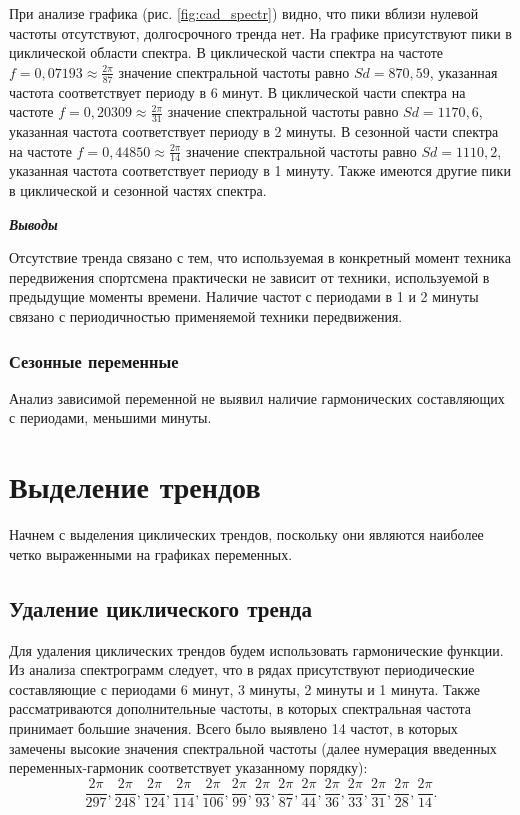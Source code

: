 \documentclass[a4paper,12pt]{article}
\begin{document}
При анализе графика (рис. \ref{fig:cad_spectr}) видно, что пики вблизи нулевой частоты отсутствуют, долгосрочного тренда нет. На графике присутствуют пики в циклической области спектра. 
В циклической части спектра на частоте $f = 0,07193 \approx \frac{2 \pi}{87}$ значение спектральной частоты равно $Sd = 870,59$, указанная частота соответствует периоду в 6 минут.
В циклической части спектра на частоте $f = 0,20309 \approx \frac{2 \pi}{31}$ значение спектральной частоты равно $Sd = 1170,6$, указанная частота соответствует периоду в 2 минуты.
В сезонной части спектра на частоте $f = 0,44850 \approx \frac{2 \pi}{14}$ значение спектральной частоты равно $Sd = 1110,2$, указанная частота соответствует периоду в 1 минуту.
Также имеются другие пики в циклической и сезонной частях спектра.


\textbf{\textit{Выводы}}

Отсутствие тренда связано с тем, что используемая в конкретный момент техника передвижения спортсмена практически не зависит от техники, используемой в предыдущие моменты времени.
Наличие частот с периодами в 1 и 2 минуты связано с периодичностью применяемой техники передвижения. %

\subsubsection{Сезонные переменные}
Анализ зависимой переменной не выявил наличие гармонических составляющих с периодами, меньшими минуты.

\section{Выделение трендов}
Начнем с выделения циклических трендов, поскольку они являются наиболее четко выраженными на графиках переменных.

\subsection{Удаление циклического тренда}
Для удаления циклических трендов будем использовать гармонические функции. Из анализа спектрограмм следует, что в рядах присутствуют периодические составляющие с периодами 6 минут, 3 минуты, 2 минуты и 1 минута. Также рассматриваются дополнительные частоты, в которых спектральная частота принимает большие значения. Всего было выявлено 14 частот, в которых замечены высокие значения спектральной частоты (далее нумерация введенных переменных-гармоник соответствует указанному порядку): $$\frac{2 \pi}{297}, \frac{2 \pi}{248}, \frac{2 \pi}{124}, \frac{2 \pi}{114}, \frac{2 \pi}{106}, \frac{2 \pi}{99}, \frac{2 \pi}{93}, \frac{2 \pi}{87}, \frac{2 \pi}{44}, \frac{2 \pi}{36}, \frac{2 \pi}{33}, \frac{2 \pi}{31}, \frac{2 \pi}{28}, \frac{2 \pi}{14}.$$
\end{document}
